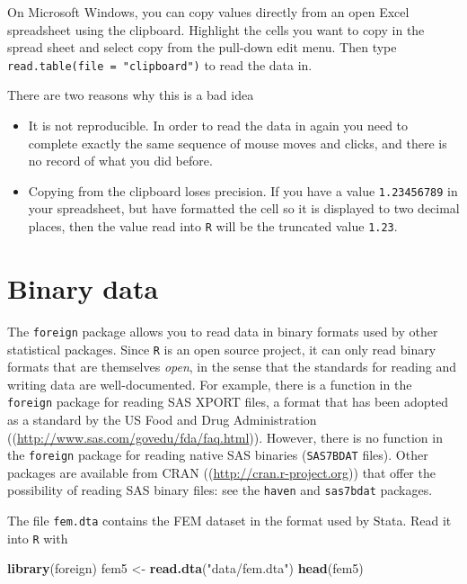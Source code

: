 \documentclass[
]{book}
\newenvironment{Shaded}{\begin{snugshade}}{\end{snugshade}}
\newcommand{\FunctionTok}[1]{\textcolor[rgb]{0.13,0.29,0.53}{\textbf{#1}}}
\newcommand{\NormalTok}[1]{#1}
\newcommand{\OtherTok}[1]{\textcolor[rgb]{0.56,0.35,0.01}{#1}}
\newcommand{\StringTok}[1]{\textcolor[rgb]{0.31,0.60,0.02}{#1}}
\providecommand{\tightlist}{%
  \setlength{\itemsep}{0pt}\setlength{\parskip}{0pt}}
\begin{document}
On Microsoft Windows, you can copy values directly from an open Excel
spreadsheet using the clipboard. Highlight the cells you want to copy
in the spread sheet and select copy from the pull-down edit menu. Then
type \texttt{read.table(file\ =\ "clipboard")} to read the data in.

There are two reasons why this is a bad idea

\begin{itemize}
\tightlist
\item
  It is not reproducible. In order to read the data in again you
  need to complete exactly the same sequence of mouse moves and clicks,
  and there is no record of what you did before.
\item
  Copying from the clipboard loses precision. If you have a value
  \texttt{1.23456789} in your spreadsheet, but have formatted the cell so it
  is displayed to two decimal places, then the value read into
  \texttt{R} will be the truncated value \texttt{1.23}.
\end{itemize}

\section{Binary data}\label{binary-data}

The \texttt{foreign} package allows you to read data in binary formats
used by other statistical packages. Since \texttt{R} is an open source
project, it can only read binary formats that are themselves \emph{open},
in the sense that the standards for reading and writing data are
well-documented. For example, there is a function in the
\texttt{foreign} package for reading SAS XPORT files, a format that
has been adopted as a standard by the US Food and Drug Administration
((\url{http://www.sas.com/govedu/fda/faq.html})). However, there is no
function in the \texttt{foreign} package for reading native SAS
binaries (\texttt{SAS7BDAT} files). Other packages are available from
CRAN ((\url{http://cran.r-project.org})) that offer the possibility of
reading SAS binary files: see the \texttt{haven} and \texttt{sas7bdat}
packages.

The file \texttt{fem.dta} contains the FEM dataset in the format
used by Stata. Read it into \texttt{R} with

\begin{Shaded}
\begin{Highlighting}[]
\FunctionTok{library}\NormalTok{(foreign)}
\NormalTok{fem5 }\OtherTok{\textless{}{-}} \FunctionTok{read.dta}\NormalTok{(}\StringTok{"data/fem.dta"}\NormalTok{)}
\FunctionTok{head}\NormalTok{(fem5)}
\end{Highlighting}
\end{Shaded}
\end{document}
